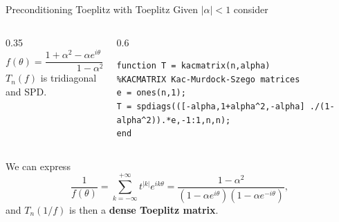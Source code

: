 \documentclass[aspectratio=169,xcolor=dvipsnames]{beamer}
\begin{document}
\begin{frame}[fragile]{Preconditioning Toeplitz with Toeplitz}
Given $|\alpha| < 1$ consider
\begin{columns}
\begin{column}{0.35\columnwidth}
\[
f(\theta) = \frac{1 + \alpha^2 - \alpha e^{i\theta} -\alpha e^{-i\theta}}{1-\alpha^2}
\]
$T_n(f)$ is tridiagonal and SPD.
\end{column}
\begin{column}{0.6\columnwidth}
%
\begin{verbatim}
function T = kacmatrix(n,alpha)
%KACMATRIX Kac-Murdock-Szego matrices
e = ones(n,1);
T = spdiags(([-alpha,1+alpha^2,-alpha] ./(1-alpha^2)).*e,-1:1,n,n);
end
\end{verbatim}
\end{column}
\end{columns}
We can express
\[
\frac{1}{f(\theta)} = \sum_{k=-\infty}^{+\infty} t^{|k|} e^{ik\theta} = \frac{1-\alpha^2}{\left(1-\alpha e^{i\theta}\right) \left(1-\alpha e^{-i\theta}\right)},
\]
and $T_n(1/f)$ is then a \textbf{dense Toeplitz matrix}.
\end{frame}
\end{document}
